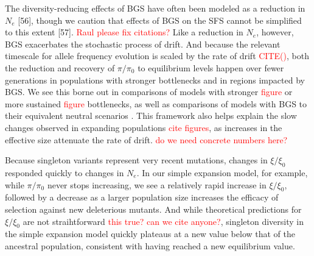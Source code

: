 \documentclass[9pt,twocolumn,twoside]{rilabRxiv}
\newcommand{\jri}[1]{{\small \textcolor{red}{#1}}}
\newcommand{\citex}[1]{{\small \textcolor{red}{CITE(#1)}}}
\begin{document}
The diversity-reducing effects of BGS have often been modeled as a reduction in $N_e$ [56], though we caution that effects of BGS on the SFS cannot be simplified to this extent [57]. \jri{Raul please fix citations?}
Like a reduction in $N_e$, however, BGS exacerbates the stochastic process of drift.
And because the relevant timescale for allele frequency evolution is scaled by the rate of drift \citex{}, both the reduction and recovery of $\pi/\pi_0$ to equilibrium levels happen over fewer generations in populations with stronger bottlenecks and in regions impacted by BGS.
We see this borne out in comparisons of models with stronger \jri{figure} or more sustained \jri{figure} bottlenecks, as well as comparisons of models with BGS to their equivalent neutral scenarios .
This framework also helps explain the slow changes observed in expanding populations \jri{cite figures}, as increases in the effective size attenuate the rate of drift.
\jri{do we need concrete numbers here?} 

Because singleton variants represent very recent mutations, changes in $\xi/\xi_0$ responded quickly to changes in $N_e$.  
In our simple expansion model, for example, while $\pi/\pi_0$ never stops increasing, we see a relatively rapid increase in $\xi/\xi_0$, followed by a decrease as a larger population size increases the efficacy of selection against new deleterious mutants. 
And while theoretical predictions for $\xi/\xi_0$ are not straihtforward \jri{this true? can we cite anyone?}, singleton diversity in the simple expansion model quickly plateaus at a new value below that of the ancestral population, consistent with having reached a new equilibrium value.
\end{document}
